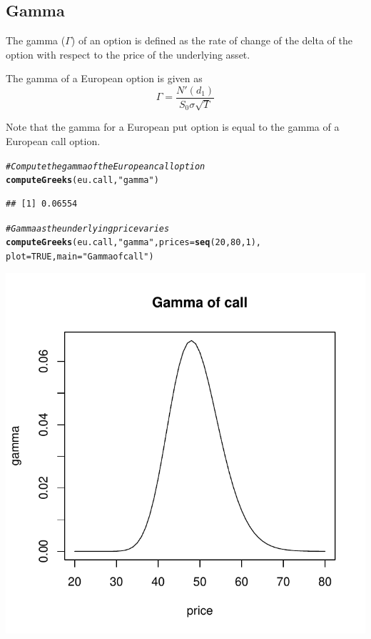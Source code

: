 \documentclass{article}\usepackage[]{graphicx}\usepackage[]{color}
\makeatletter
\def\maxwidth{ %
  \ifdim\Gin@nat@width>\linewidth
    \linewidth
  \else
    \Gin@nat@width
  \fi
}
\newcommand{\hlstr}[1]{\textcolor[rgb]{0.192,0.494,0.8}{#1}}%
\newcommand{\hlcom}[1]{\textcolor[rgb]{0.678,0.584,0.686}{\textit{#1}}}%
\newcommand{\hlkwd}[1]{\textcolor[rgb]{0.737,0.353,0.396}{\textbf{#1}}}%
\newenvironment{kframe}{%
 \def\at@end@of@kframe{}%
 \ifinner\ifhmode%
  \def\at@end@of@kframe{\end{minipage}}%
  \begin{minipage}{\columnwidth}%
 \fi\fi%
 \def\FrameCommand##1{\hskip\@totalleftmargin \hskip-\fboxsep
 \colorbox{shadecolor}{##1}\hskip-\fboxsep
     \hskip-\linewidth \hskip-\@totalleftmargin \hskip\columnwidth}%
 \MakeFramed {\advance\hsize-\width
   \@totalleftmargin\z@ \linewidth\hsize
   \@setminipage}}%
 {\par\unskip\endMakeFramed%
 \at@end@of@kframe}
\newenvironment{knitrout}{}{} %
\makeatother
\begin{document}
\subsection{Gamma}
The gamma ($\Gamma$) of an option is defined as the rate of change of the delta of the option with respect to the price of the underlying asset.

The gamma of a European option is given as
\begin{equation*}
\Gamma = \frac{N'(d_1)}{S_0 \sigma \sqrt{T}}
\end{equation*}

Note that the gamma for a European put option is equal to the gamma of a European call option.

\begin{knitrout}
\color{fgcolor}\begin{kframe}
\begin{alltt}
\hlcom{# Compute the gamma of the European call option}
\hlkwd{computeGreeks}(eu.call, \hlstr{"gamma"})
\end{alltt}
\begin{verbatim}
## [1] 0.06554
\end{verbatim}
\end{kframe}
\end{knitrout}


\begin{knitrout}
\color{fgcolor}\begin{kframe}
\begin{alltt}
\hlcom{# Gamma as the underlying price varies}
\hlkwd{computeGreeks}(eu.call, \hlstr{"gamma"}, prices = \hlkwd{seq}(20, 80, 1), 
              plot = TRUE, main=\hlstr{"Gamma of call"})
\end{alltt}
\end{kframe}
\includegraphics[width=\maxwidth]{figure/unnamed-chunk-16} 

\end{knitrout}
\end{document}

